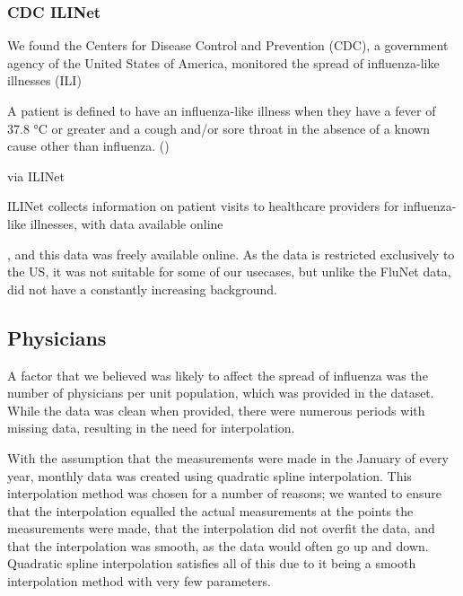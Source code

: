 \documentclass[letterpaper,10pt,english]{sphinxmanual}
\begin{document}
\subsubsection{CDC ILINet}
\label{\detokenize{datasets:cdc-ilinet}}
We found the Centers for Disease Control and Prevention (CDC), a government agency of the United States of America, monitored the spread of influenza-like illnesses (ILI) %
\begin{footnote}[1]\sphinxAtStartFootnote
A patient is defined to have an influenza-like illness when they have a fever of 37.8 °C or greater and a cough and/or sore throat in the absence of a known cause other than influenza. ()
%
\end{footnote} via ILINet %
\begin{footnote}[2]\sphinxAtStartFootnote
ILINet collects information on patient visits to healthcare providers for influenza-like illnesses, with data available online 
%
\end{footnote}, and this data was freely available online. As the data is restricted exclusively to the US, it was not suitable for some of our usecases, but unlike the FluNet data, did not have a constantly increasing background.


\subsection{Physicians}
\label{\detokenize{datasets:physicians}}
A factor that we believed was likely to affect the spread of influenza was the number of physicians per unit population, which was provided in the  dataset. While the data was clean when provided, there were numerous periods with missing data, resulting in the need for interpolation.

With the assumption that the measurements were made in the January of every year, monthly data was created using quadratic spline interpolation. This interpolation method was chosen for a number of reasons; we wanted to ensure that the interpolation equalled the actual measurements at the points the measurements were made, that the interpolation did not overfit the data, and that the interpolation was smooth, as the data would often go up and down. Quadratic spline interpolation satisfies all of this due to it being a smooth interpolation method with very few parameters.
\end{document}
